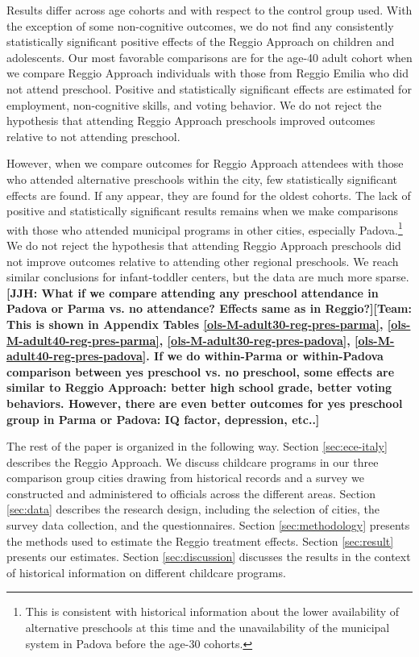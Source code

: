 Results differ across age cohorts and with respect to the control group used. With the exception of some non-cognitive outcomes, we do not find any consistently statistically significant positive effects of the Reggio Approach on children and adolescents. Our most favorable comparisons are for the age-40 adult cohort when we compare Reggio Approach individuals with those from Reggio Emilia who did not attend preschool. Positive and statistically significant effects are estimated for employment, non-cognitive skills, and voting behavior. We do not reject the hypothesis that attending Reggio Approach preschools improved outcomes relative to not attending preschool.

However, when we compare outcomes for Reggio Approach attendees with those who attended alternative preschools within the city, few statistically significant effects are found. If any appear, they are found for the oldest cohorts. The lack of positive and statistically significant results remains when we make comparisons with those who attended municipal programs in other cities, especially Padova.\footnote{This is consistent with historical information about the lower availability of alternative preschools at this time and the unavailability of the municipal system in Padova before the age-30 cohorts.} We do not reject the hypothesis that attending Reggio Approach preschools did not improve outcomes relative to attending other regional preschools. We reach similar conclusions for infant-toddler centers, but the data are much more sparse. \textbf{[JJH: What if we compare attending any preschool attendance in Padova or Parma vs. no attendance? Effects same as in Reggio?][Team: This is shown in Appendix Tables \ref{ols-M-adult30-reg-pres-parma}, \ref{ols-M-adult40-reg-pres-parma}, \ref{ols-M-adult30-reg-pres-padova}, \ref{ols-M-adult40-reg-pres-padova}. If we do within-Parma or within-Padova comparison between yes preschool vs. no preschool, some effects are similar to Reggio Approach: better high school grade, better voting behaviors. However, there are even better outcomes for yes preschool group in Parma or Padova: IQ factor, depression, etc..]}

The rest of the paper is organized in the following way. Section \ref{sec:ece-italy} describes the Reggio Approach. We discuss childcare programs in our three comparison group cities drawing from historical records and a survey we constructed and administered to officials across the different areas. Section \ref{sec:data} describes the research design, including the selection of cities, the survey data collection, and the questionnaires. Section \ref{sec:methodology} presents the methods used to estimate the Reggio treatment effects. Section \ref{sec:result} presents our estimates. Section \ref{sec:discussion} discusses the results in the context of historical information on different childcare programs.

